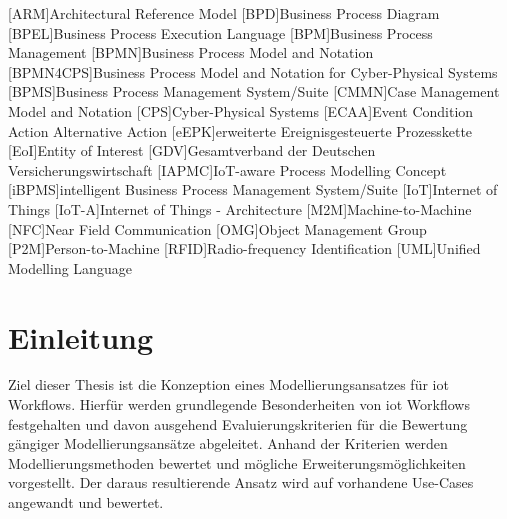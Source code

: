 \documentclass[a4paper, 12pt, twoside, headsepline=true]{scrartcl} %
\begin{document}
\tableofcontents
\clearpage
\newpage


\begin{acronym}[header=Abkürzungsverzeichnis]
	[ARM]{Architectural Reference Model}
	[BPD]{Business Process Diagram}
	[BPEL]{Business Process Execution Language}
	[BPM]{Business Process Management}
	[BPMN]{Business Process Model and Notation}
	[BPMN4CPS]{Business Process Model and Notation for Cyber-Physical Systems}
	[BPMS]{Business Process Management System/Suite}
	[CMMN]{Case Management Model and Notation}
	[CPS]{Cyber-Physical Systems}
	[ECAA]{Event Condition Action Alternative Action}
	[eEPK]{erweiterte Ereignisgesteuerte Prozesskette}
	[EoI]{Entity of Interest}
	[GDV]{Gesamtverband der Deutschen Versicherungswirtschaft}
	[IAPMC]{IoT-aware Process Modelling Concept}
	[iBPMS]{intelligent Business Process Management System/Suite}
	[IoT]{Internet of Things}
	[IoT-A]{Internet of Things - Architecture}
	[M2M]{Machine-to-Machine}
	[NFC]{Near Field Communication}
	[OMG]{Object Management Group}
	[P2M]{Person-to-Machine}
	[RFID]{Radio-frequency Identification}
	[UML]{Unified Modelling Language}
\end{acronym}

\clearpage


\listoftables

\clearpage

\listoffigures
\clearpage


\section{Einleitung} \label{sec:section}
Ziel dieser Thesis ist die Konzeption eines Modellierungsansatzes für \ac{iot}
Workflows. Hierfür werden grundlegende Besonderheiten von \ac{iot} Workflows festgehalten und davon ausgehend Evaluierungskriterien für die Bewertung gängiger Modellierungsansätze abgeleitet. Anhand der Kriterien werden Modellierungsmethoden bewertet und mögliche Erweiterungsmöglichkeiten vorgestellt. Der daraus resultierende Ansatz wird auf vorhandene Use-Cases angewandt und bewertet.
\end{document}

